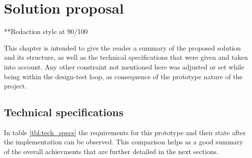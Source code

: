 \chapter{Solution proposal}\label{cha:solution}
**Redaction style at 90/100

This chapter is intended to give the reader a summary of the proposed solution and its structure, as well as 
the technical specifications that were given and taken into account. Any other constraint not mentioned here 
was adjusted or set while being within the design-test loop, as consequence of the prototype nature of the project.

\section{Technical specifications}

In table \ref{tbl:tech_specs} the requirements for this prototype and their state after the implementation can be observed.
This comparison helps as a good summary of the overall achievments that are further detailed in the next sections.

